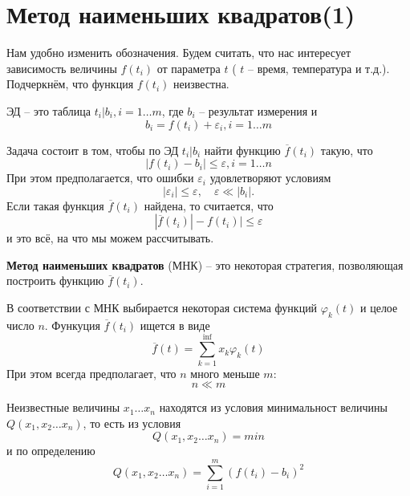 \section{Метод наименьших квадратов(1)}

\label{lecture5}
Нам удобно изменить обозначения. Будем считать, что нас интересует зависимость величины $f(t_i)$ от параметра  $t$ ( $t$ -- время, температура и т.д.). Подчеркнём, что функция $f(t_i)$ неизвестна.

ЭД -- это таблица $t_i | b_i, i = 1 \dots m$, где $b_i$ -- результат измерения и 
\begin{equation}
	b_i = f(t_i) + \varepsilon_i, i = 1 \dots m
\end{equation}

Задача состоит в том, чтобы по ЭД  $t_i | b_i$ найти функцию $\overline f(t_i)$ такую, что 
\begin{equation}
	|f(t_i) - b_i| \leq \varepsilon,  i = 1 \dots n
\end{equation}
При этом предполагается, что ошибки $\varepsilon_i$ удовлетворяют условиям
\begin{equation}
	|\varepsilon_i | \leq \varepsilon , \quad \varepsilon \ll  |b_i| .
\end{equation}
Если такая функция $\overline f(t_i)$ найдена, то считается, что
\begin{equation}
	|\overline f(t_i)| - f(t_i) | \leq \varepsilon
\end{equation}
и это всё, на что мы можем рассчитывать.

\vspace{1cm}
\textbf{Метод наименьших квадратов} (МНК) --  это некоторая стратегия, позволяющая построить функцию $\overline f(t_i)$.

В соответствии с МНК выбирается некоторая система функций $\varphi_k (t) $ и целое число $n$. Функуция $\overline f(t_i)$ ищется в виде 
\begin{equation}
	\overline{f} (t) = \sum_{k=1}^\inf {x_k \varphi_k (t) }
\end{equation}
При этом всегда предполагает, что $n$ много меньше $m$:
\begin{equation}
	n \ll m
\end{equation}

Неизвестные величины $x_1 \dots x_n$ находятся из условия минимальност величины $Q(x_1, x_2 \dots x_n)$, то есть из условия
\begin{equation} \label{eq:5.7}
	Q(x_1, x_2 \dots x_n) = min
\end{equation}
и по определению
\begin{equation} 
	Q(x_1, x_2 \dots x_n) = \sum_{i=1}^m {(f(t_i) - b_i)^2}
\end{equation}

